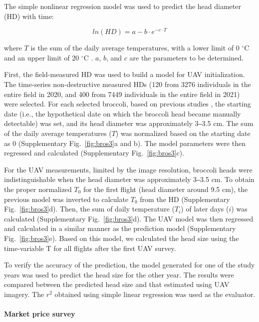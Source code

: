 The simple nonlinear regression model \citep{grevsen_effects_1997} was used to predict the head diameter (HD) with time:

$$ln(HD) = a - b \cdot e ^ {- c \cdot T}$$

\noindent
where $T$ is the sum of the daily average temperatures, with a lower limit of 0 $^\circ$C and an upper limit of 20 $^\circ$C \citep{tan_predicting_2000,cammarano_predicting_2020}. $a$, $b$, and $c$ are the parameters to be determined.

First, the field-measured HD was used to build a model for UAV initialization. The time-series non-destructive measured HDs (120 from 3276 individuals in the entire field in 2020, and 400 from 7449 individuals in the entire field in 2021) were selected. For each selected broccoli, based on previous studies \citep{cammarano_predicting_2020}, the starting date (i.e., the hypothetical date on which the broccoli head became manually detectable) was set, and its head diameter was approximately 3‒3.5 cm. The sum of the daily average temperatures ($T$) was normalized based on the starting date as 0 (Supplementary Fig.~\ref{fig:bros3}a and b). The model parameters were then regressed and calculated (Supplementary Fig.~\ref{fig:bros3}c). 

For the UAV measurements, limited by the image resolution, broccoli heads were indistinguishable when the head diameter was approximately 3‒3.5 cm. To obtain the proper normalized $T_0$ for the first flight (head diameter around 9.5 cm), the previous model was inverted to calculate $T_0$ from the HD (Supplementary Fig.~\ref{fig:bros3}d). Then, the sum of daily temperature ($T_i$) of later days ($i$) was calculated (Supplementary Fig.~\ref{fig:bros3}d). The UAV model was then regressed and calculated in a similar manner as the prediction model (Supplementary Fig.~\ref{fig:bros3}e). Based on this model, we calculated the head size using the time-variable T for all flights after the first UAV survey.

To verify the accuracy of the prediction, the model generated for one of the study years was used to predict the head size for the other year. The results were compared between the predicted head size and that estimated using UAV imagery. The $r^2$ obtained using simple linear regression was used as the evaluator.

\paragraph{Market price survey}


